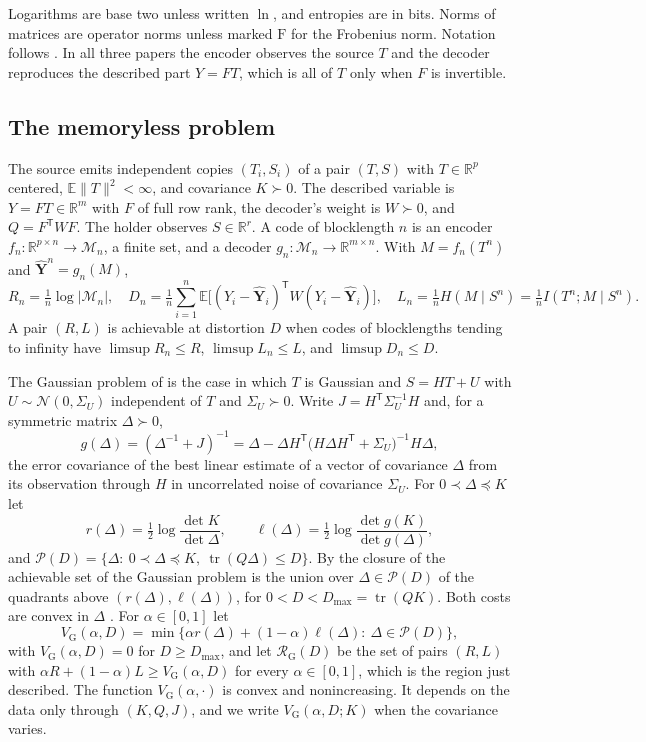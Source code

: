 \documentclass[11pt,onecolumn]{IEEEtran}
\newcommand{\E}{\mathbb{E}}
\newcommand{\R}{\mathbb{R}}
\newcommand{\tr}{\operatorname{tr}}
\newcommand{\hY}{\hat{\mathbf Y}}
\newcommand{\VG}{V_{\mathrm G}}
\newcommand{\RG}{\mathcal R_{\mathrm G}}
\newcommand{\fro}{\mathrm F}
\begin{document}
Logarithms are base two unless written $\ln$, and entropies are in
bits. Norms of matrices are operator norms unless marked $\fro$ for
the Frobenius norm. Notation follows \cite{part1,part2}. In all three
papers the encoder observes the source $T$ and the decoder reproduces
the described part $Y=FT$, which is all of $T$ only when $F$ is
invertible.

\subsection{The memoryless problem}

The source emits independent copies $(T_i,S_i)$ of a pair $(T,S)$ with
$T\in\R^p$ centered, $\E\|T\|^2<\infty$, and covariance $K\succ0$. The
described variable is $Y=FT\in\R^m$ with $F$ of full row rank, the
decoder's weight is $W\succ0$, and $Q=F^{\mathsf T}WF$. The holder
observes $S\in\R^r$. A code of blocklength $n$ is an encoder
$f_n:\R^{p\times n}\to\mathcal M_n$, a finite set, and a decoder
$g_n:\mathcal M_n\to\R^{m\times n}$. With $M=f_n(T^n)$ and
$\hY^n=g_n(M)$,
\[
R_n=\tfrac1n\log|\mathcal M_n|,\quad
D_n=\tfrac1n\sum_{i=1}^n\E\bigl[(Y_i-\hY_i)^{\mathsf T}W(Y_i-\hY_i)\bigr],\quad
L_n=\tfrac1nH(M\mid S^n)=\tfrac1nI(T^n;M\mid S^n).
\]
A pair $(R,L)$ is achievable at distortion $D$ when codes of
blocklengths tending to infinity have $\limsup R_n\le R$,
$\limsup L_n\le L$, and $\limsup D_n\le D$.

The Gaussian problem of \cite{part1} is the case in which $T$ is
Gaussian and $S=HT+U$ with $U\sim\mathcal N(0,\Sigma_U)$ independent of
$T$ and $\Sigma_U\succ0$. Write $J=H^{\mathsf T}\Sigma_U^{-1}H$ and, for a
symmetric matrix $\Delta\succ0$,
\[
g(\Delta)=(\Delta^{-1}+J)^{-1}=\Delta-\Delta H^{\mathsf T}\bigl(H\Delta H^{\mathsf T}+\Sigma_U\bigr)^{-1}H\Delta ,
\]
the error covariance of the best linear estimate of a vector of
covariance $\Delta$ from its observation through $H$ in uncorrelated
noise of covariance $\Sigma_U$. For $0\prec\Delta\preceq K$ let
\begin{equation}
r(\Delta)=\tfrac12\log\frac{\det K}{\det\Delta},\qquad
\ell(\Delta)=\tfrac12\log\frac{\det g(K)}{\det g(\Delta)},
\label{eq:costs}
\end{equation}
and $\mathcal P(D)=\{\Delta:\ 0\prec\Delta\preceq K,\ \tr(Q\Delta)\le D\}$.
By \cite[Proposition~2 and Theorem~3]{part1} the closure of the
achievable set of the Gaussian problem is the union over
$\Delta\in\mathcal P(D)$ of the quadrants above
$(r(\Delta),\ell(\Delta))$, for $0<D<D_{\max}=\tr(QK)$. Both costs are
convex in $\Delta$ \cite[Theorem~5]{part1}. For $\alpha\in[0,1]$ let
\[
\VG(\alpha,D)=\min\bigl\{\alpha r(\Delta)+(1-\alpha)\ell(\Delta):\ \Delta\in\mathcal P(D)\bigr\},
\]
with $\VG(\alpha,D)=0$ for $D\ge D_{\max}$, and let $\RG(D)$ be the set
of pairs $(R,L)$ with $\alpha R+(1-\alpha)L\ge\VG(\alpha,D)$ for every
$\alpha\in[0,1]$, which is the region just described. The function
$\VG(\alpha,\cdot)$ is convex and nonincreasing. It depends on the data
only through $(K,Q,J)$, and we write $\VG(\alpha,D;K)$ when the
covariance varies.
\end{document}
